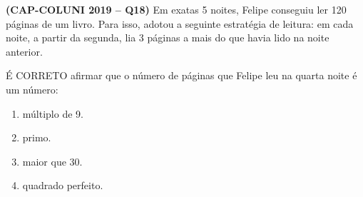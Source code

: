 \textbf{(CAP-COLUNI 2019 -- Q18)} Em exatas 5 noites, Felipe conseguiu ler 120 páginas de um livro. Para isso, adotou a seguinte estratégia de leitura: em cada noite, a partir da segunda, lia 3 páginas a mais do que havia lido na noite anterior.

É CORRETO afirmar que o número de páginas que Felipe leu na quarta noite é um número:

\begin{enumerate}
	\item múltiplo de 9.
	\item primo.
	\item maior que 30.
	\item quadrado perfeito.
\end{enumerate}
